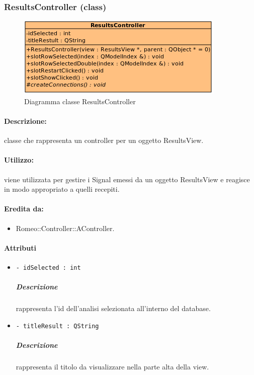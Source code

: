 	\subsubsection{ResultsController (class)}
	\begin{figure}[!h]
		\centering
		\includegraphics[width=0.6\linewidth]{./Content/Immagini/controller/ResultsController.png}
		\caption{Diagramma classe ResultsController}
	\end{figure}
	\paragraph{Descrizione:} classe che rappresenta un controller per un oggetto ResultsView.
	\paragraph{Utilizzo:} viene utilizzata per gestire i Signal\g{} emessi da un oggetto ResultsView e reagisce in modo appropriato a quelli recepiti.
	\paragraph{Eredita da:}
		\begin{itemize}
			\item Romeo::Controller::AController.
		\end{itemize}
	\paragraph{Attributi}
		\begin{itemize}
			\item \color{teal} \verb!- idSelected : int!
			\color{black}
			\subparagraph{Descrizione} rappresenta l'id dell'analisi selezionata all'interno del database.
			\item \color{teal} \verb!- titleResult : QString!
			\color{black}
			\subparagraph{Descrizione} rappresenta il titolo da visualizzare nella parte alta della view.
		\end{itemize}
